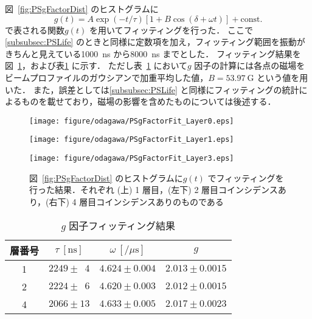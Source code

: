 図~\ref{fig:PSgFactorDist} のヒストグラムに%
\begin{equation}
g(t) = A \exp(-t / \tau) [1 + B \cos(\delta + \omega t)] + \mathrm{const.}
\label{eq:PSgFactorFitFunc}
\end{equation}
で表される関数$g(t)$ を用いてフィッティングを行った．
ここで\ref{subsubsec:PSLife} のときと同様に定数項を加え，フィッティング範囲を振動がきちんと見えている1000~ns から8000~ns までとした．
フィッティング結果を図~\ref{fig:PSgFactorFit}，および表\ref{tab:PSgFactor} に示す．
ただし表~\ref{tab:PSgFactor} において$g$ 因子の計算には各点の磁場をビームプロファイルのガウシアンで加重平均した値，$B = 53.97~\mathrm{G}$ という値を用いた．
また，誤差としては\ref{subsubsec:PSLife} と同様にフィッティングの統計によるものを載せており，磁場の影響を含めたものについては後述する．
\begin{figure}[h]
	\centering
	\texttt{[image: figure/odagawa/PSgFactorFit\_Layer0.eps]}\\
	\begin{minipage}{0.45\textwidth}
	\centering
	\texttt{[image: figure/odagawa/PSgFactorFit\_Layer1.eps]}
	\end{minipage}
	\begin{minipage}{0.45\textwidth}
	\centering
	\texttt{[image: figure/odagawa/PSgFactorFit\_Layer3.eps]}
	\end{minipage}
	\caption{図~\ref{fig:PSgFactorDist} のヒストグラムに$g(t)$ でフィッティングを行った結果．それぞれ (上) 1 層目，(左下) 2 層目コインシデンスあり，(右下) 4 層目コインシデンスありのものである}
	\label{fig:PSgFactorFit}
\end{figure}%
\begin{table}[h]
	\centering
	\caption{$g$ 因子フィッティング結果}
	\begin{tabular}{cccc} \toprule
	層番号 & $\tau~[\mathrm{ns}]$ & $\omega~[/ \mu\mathrm{s}]$ & $g$ \\ \midrule
	1 & $2249 \pm \phantom{0}4$ & $4.624 \pm 0.004$ & $2.013 \pm 0.0015$ \\  
	2 & $2224 \pm \phantom{0}6$ & $4.620 \pm 0.003$ & $2.012 \pm 0.0015$ \\  
	4 & $2066 \pm 13$ & $4.633 \pm 0.005$ & $2.017 \pm 0.0023$ \\  \bottomrule
	\end{tabular}\label{tab:PSgFactor}
\end{table}%

